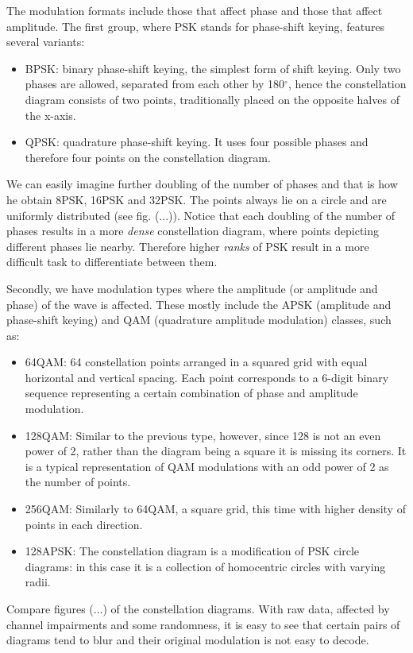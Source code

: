 \documentclass[12pt]{article}
\theoremstyle{plain}
\theoremstyle{definition}
\theoremstyle{remark}
\begin{document}
	The modulation formats include those that affect phase and those that affect amplitude. The first group, where PSK stands for phase-shift keying, features several variants:
	\begin{itemize}
		\item BPSK: binary phase-shift keying, the simplest form of shift keying. Only two phases are allowed, separated from each other by 180$^\circ$, hence the constellation diagram consists of two points, traditionally placed on the opposite halves of the x-axis.
		\item QPSK: quadrature phase-shift keying. It uses four possible phases and therefore four points on the constellation diagram.
	\end{itemize}
We can easily imagine further doubling of the number of phases and that is how he obtain 8PSK, 16PSK and 32PSK. The points always lie on a circle and are uniformly distributed (see fig. (...)). Notice that each doubling of the number of phases results in a more \textit{dense} constellation diagram, where points depicting different phases lie nearby. Therefore higher \textit{ranks} of PSK result in a more difficult task to differentiate between them.

Secondly, we have modulation types where the amplitude (or amplitude and phase) of the wave is affected. These mostly include the APSK (amplitude and phase-shift keying) and QAM (quadrature amplitude modulation) classes, such as:
\begin{itemize}
	\item 64QAM: 64 constellation points arranged in a squared grid with equal horizontal and vertical spacing. Each point corresponds to a 6-digit binary sequence representing a certain combination of phase and amplitude modulation.
	\item 128QAM: Similar to the previous type, however, since 128 is not an even power of 2, rather than the diagram being a square it is missing its corners. It is a typical representation of QAM modulations with an odd power of 2 as the number of points.
	\item 256QAM: Similarly to 64QAM, a square grid, this time with higher density of points in each direction.
	\item 128APSK: The constellation diagram is a modification of PSK circle diagrams: in this case it is a collection of homocentric circles with varying radii.
\end{itemize}
Compare figures (...) of the constellation diagrams. With raw data, affected by channel impairments and some randomness, it is easy to see that certain pairs of diagrams tend to blur and their original modulation is not easy to decode.
\end{document}
